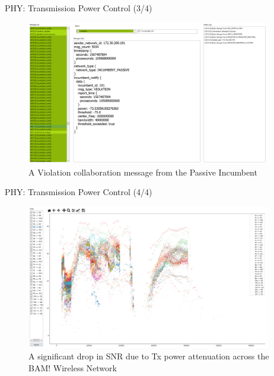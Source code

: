 \documentclass{beamer}
\begin{document}
\begin{frame}{PHY: Transmission Power Control (3/4)}
\begin{figure}
    \centering
    \includegraphics[width = 0.95\textwidth]{Passive_Incumbent_1.jpg}
    \caption{A Violation collaboration message from the Passive Incumbent}
    \label{fig:3}
\end{figure}
\end{frame}
\begin{frame}{PHY: Transmission Power Control (4/4)}
\begin{figure}
    \centering
    \includegraphics[width = 0.95\textwidth]{Passive_Incumbent_2.jpg}
    \caption{A significant drop in SNR due to Tx power attenuation across the BAM! Wireless Network}
    \label{fig:4}
\end{figure}
\end{frame}
\end{document}
